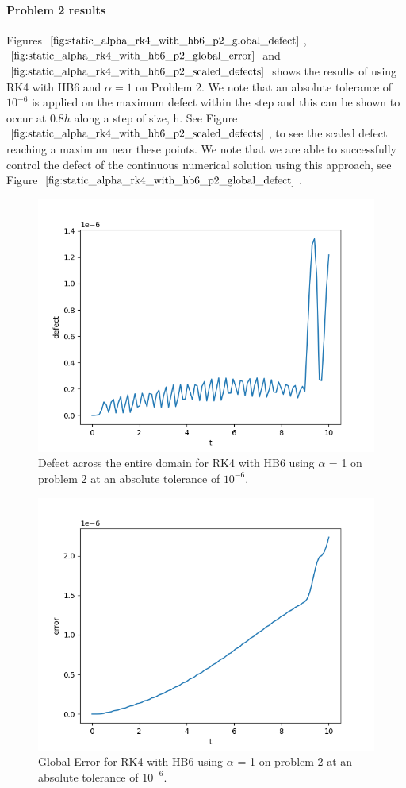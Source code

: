 \paragraph{Problem 2 results}
Figures $\ref{fig:static_alpha_rk4_with_hb6_p2_global_defect}$, $\ref{fig:static_alpha_rk4_with_hb6_p2_global_error}$ and $\ref{fig:static_alpha_rk4_with_hb6_p2_scaled_defects}$ shows the results of using RK4 with HB6 and $\alpha = 1$ on Problem 2. We note that an absolute tolerance of $10^{-6}$ is applied on the maximum defect within the step and this can be shown to occur at $0.8h$ along a step of size, h. See Figure $\ref{fig:static_alpha_rk4_with_hb6_p2_scaled_defects}$, to see the scaled defect reaching a maximum near these points. We note that we are able to successfully control the defect of the continuous numerical solution using this approach, see Figure $\ref{fig:static_alpha_rk4_with_hb6_p2_global_defect}$. 
\begin{figure}[H]
\centering
\includegraphics[width=0.7\linewidth]{./figures/static_alpha_rk4_with_hb6_p2_global_defect}
\caption{Defect across the entire domain for RK4 with HB6 using $\alpha$ = 1 on problem 2 at an absolute tolerance of $10^{-6}$.}
\label{fig:static_alpha_rk4_with_hb6_p2_global_defect}
\end{figure}

\begin{figure}[H]
\centering
\includegraphics[width=0.7\linewidth]{./figures/static_alpha_rk4_with_hb6_p2_global_error}
\caption{Global Error for RK4 with HB6 using $\alpha$ = 1 on problem 2 at an absolute tolerance of $10^{-6}$.}
\label{fig:static_alpha_rk4_with_hb6_p2_global_error}
\end{figure}

